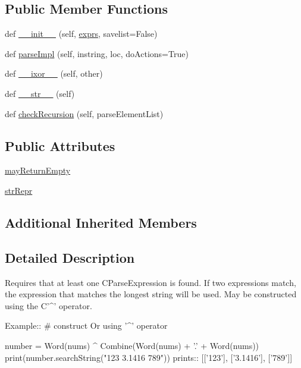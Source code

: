 \subsection*{Public Member Functions}
\begin{DoxyCompactItemize}
\item 
def \hyperlink{classsetuptools_1_1__vendor_1_1pyparsing_1_1Or_a68d209328487bf3f8e70efb3f9f7f114}{\+\_\+\+\_\+init\+\_\+\+\_\+} (self, \hyperlink{classsetuptools_1_1__vendor_1_1pyparsing_1_1ParseExpression_a4e2611e5f2c7118fb18cdc4a710bd3db}{exprs}, savelist=False)
\item 
def \hyperlink{classsetuptools_1_1__vendor_1_1pyparsing_1_1Or_a4b5bd6872dfe9002f590802f902328cd}{parse\+Impl} (self, instring, loc, do\+Actions=True)
\item 
def \hyperlink{classsetuptools_1_1__vendor_1_1pyparsing_1_1Or_a18953323a799c8234ef73ce10a4afb72}{\+\_\+\+\_\+ixor\+\_\+\+\_\+} (self, other)
\item 
def \hyperlink{classsetuptools_1_1__vendor_1_1pyparsing_1_1Or_ada6d1a60f3284ea741fe53ae77e7a38f}{\+\_\+\+\_\+str\+\_\+\+\_\+} (self)
\item 
def \hyperlink{classsetuptools_1_1__vendor_1_1pyparsing_1_1Or_a3e7cea25c071116e2554f41c8bdc65d6}{check\+Recursion} (self, parse\+Element\+List)
\end{DoxyCompactItemize}
\subsection*{Public Attributes}
\begin{DoxyCompactItemize}
\item 
\hyperlink{classsetuptools_1_1__vendor_1_1pyparsing_1_1Or_a9fdd01868295eb0d39b27fa15bbabd14}{may\+Return\+Empty}
\item 
\hyperlink{classsetuptools_1_1__vendor_1_1pyparsing_1_1Or_aad2de411355fe47546488fded5f3b696}{str\+Repr}
\end{DoxyCompactItemize}
\subsection*{Additional Inherited Members}


\subsection{Detailed Description}
\begin{DoxyVerb}Requires that at least one C{ParseExpression} is found.
If two expressions match, the expression that matches the longest string will be used.
May be constructed using the C{'^'} operator.

Example::
    # construct Or using '^' operator
    
    number = Word(nums) ^ Combine(Word(nums) + '.' + Word(nums))
    print(number.searchString("123 3.1416 789"))
prints::
    [['123'], ['3.1416'], ['789']]
\end{DoxyVerb}
 

